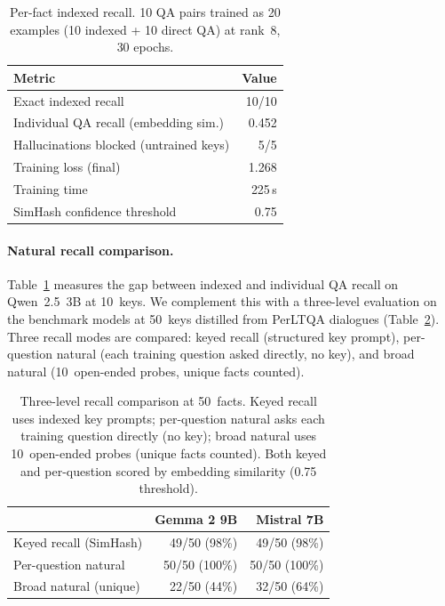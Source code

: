 \documentclass[11pt]{article}
\begin{document}
\begin{table}[t]
\centering
\caption{Per-fact indexed recall. 10 QA pairs trained as 20 examples (10 indexed + 10 direct QA) at rank~8, 30 epochs.}
\label{tab:recall}
\small
\begin{tabular}{@{}lr@{}}
\toprule
\textbf{Metric} & \textbf{Value} \\
\midrule
Exact indexed recall & 10/10 \\
Individual QA recall (embedding sim.) & 0.452 \\
Hallucinations blocked (untrained keys) & 5/5 \\
Training loss (final) & 1.268 \\
Training time & 225\,s \\
SimHash confidence threshold & 0.75 \\
\bottomrule
\end{tabular}
\end{table}

\paragraph{Natural recall comparison.}
Table~\ref{tab:recall} measures the gap between indexed and individual QA recall on Qwen~2.5~3B at 10~keys.
We complement this with a three-level evaluation on the benchmark models at 50~keys distilled from PerLTQA dialogues (Table~\ref{tab:natural-recall}).
Three recall modes are compared: keyed recall (structured key prompt), per-question natural (each training question asked directly, no key), and broad natural (10~open-ended probes, unique facts counted).

\begin{table}[t]
\centering
\caption{Three-level recall comparison at 50~facts. Keyed recall uses indexed key prompts; per-question natural asks each training question directly (no key); broad natural uses 10~open-ended probes (unique facts counted). Both keyed and per-question scored by embedding similarity (0.75 threshold).}
\label{tab:natural-recall}
\small
\begin{tabular}{@{}lrr@{}}
\toprule
& \textbf{Gemma 2 9B} & \textbf{Mistral 7B} \\
\midrule
Keyed recall (SimHash)     & 49/50 (98\%)  & 49/50 (98\%) \\
Per-question natural       & 50/50 (100\%) & 50/50 (100\%) \\
Broad natural (unique)     & 22/50 (44\%)  & 32/50 (64\%) \\
\bottomrule
\end{tabular}
\end{table}
\end{document}
